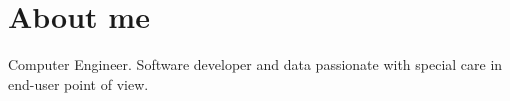\documentclass[11pt,a4paper,sans]{moderncv}
\begin{document}
\maketitle

\section{About me}
\cvitem
    {}
    {Computer Engineer. Software developer and data passionate with special care in end-user point of view.}{}





\nocite{*}
%
\end{document}
